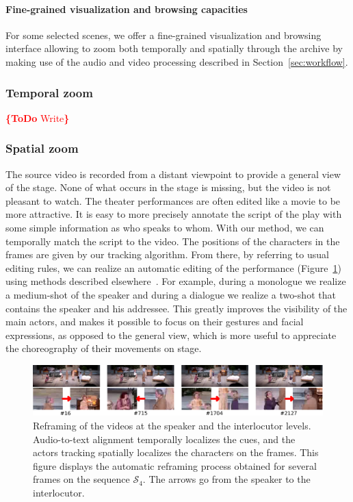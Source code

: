 \documentclass[conference]{IEEEtran}
\newcommand{\todo}[1]{\noindent\textcolor{red}{{\bf \{ToDo} #1{\bf \}}}}
\begin{document}
\paragraph{Fine-grained visualization and browsing capacities}
For some selected scenes, we offer a fine-grained visualization and browsing interface allowing to zoom both temporally and spatially
through the archive by making use of the audio and video processing described in Section~\ref{sec:workflow}.  

\subsubsection{Temporal zoom} \todo{Write}

\subsubsection{Spatial zoom}
The source video  is recorded from a distant viewpoint  to provide  a general  view of the stage.  None of what occurs in the stage is missing, but the video is not pleasant to watch.  The theater performances are often edited like a movie to be more attractive.   It is easy to more precisely annotate the script of the play with some simple information as who speaks to whom. With our method, we can temporally match the script to the video.  The positions of the characters in the frames are given by our tracking algorithm.  From there, by referring to usual editing rules, we can realize an automatic editing of the performance (Figure~\ref{fig_speaker}) using methods described elsewhere~\cite{Gandhi14}.  For example, during a monologue we realize a medium-shot of the speaker and during a dialogue we realize a two-shot that contains the speaker and his addressee. This greatly improves the visibility of the main actors, and makes it possible to focus on their gestures and facial expressions, as opposed to the general view, which is more useful to appreciate the choreography of their movements on stage.

\begin{figure}[tp]
\centering
\includegraphics[width=\textwidth]{speakers2}
\caption{Reframing of the videos at the speaker and the interlocutor levels. Audio-to-text alignment temporally localizes the cues, and the actors tracking spatially localizes the characters on the frames. 
This figure displays the automatic reframing process obtained for several frames on the sequence $\mathcal{S}_4$. The arrows go from the speaker to the interlocutor.}
\label{fig_speaker}
\end{figure}
\end{document}
